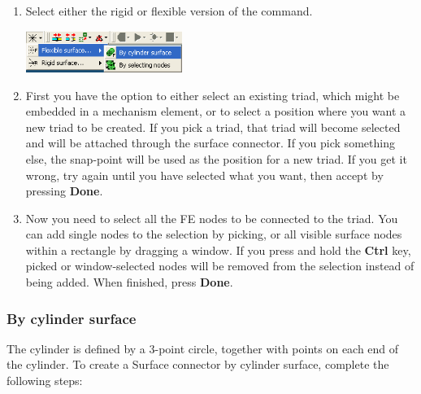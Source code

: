 \begin{enumerate}
\item
  Select either the rigid or flexible version of the command.
  \begin{center}
    \includegraphics[width=0.4\textwidth]{Figures/3-SpiderByCylinder}
  \end{center}

\item
  First you have the option to either select an existing triad, which
  might be embedded in a mechanism element, or to select a position
  where you want a new triad to be created.
  If you pick a triad, that triad will become selected and will be
  attached through the surface connector. If you pick something else, the
  snap-point will be used as the position for a new triad.
  If you get it wrong, try again until you have selected what you want,
  then accept by pressing \textbf{Done}.

\item
  Now you need to select all the FE nodes to be connected to the triad.
  You can add single nodes to the selection by picking, or all visible surface
  nodes within a rectangle by dragging a window.
  If you press and hold the \textbf{Ctrl} key, picked or window-selected nodes
  will be removed from the selection instead of being added.
  When finished, press \textbf{Done}.
\end{enumerate}

\subsubsection{By cylinder surface}


The cylinder is defined by a 3-point circle,
together with points on each end of the cylinder.
To create a Surface connector by cylinder surface, complete the following steps:

